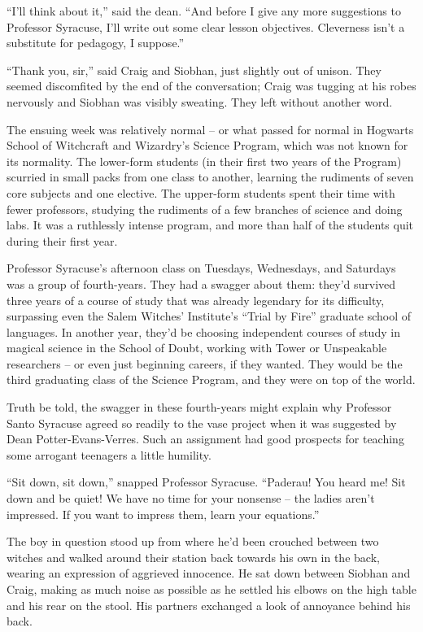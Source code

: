 ``I'll think about it,'' said the dean. ``And before I give any more
suggestions to Professor Syracuse, I'll write out some clear lesson
objectives. Cleverness isn't a substitute for pedagogy, I suppose.''

``Thank you, sir,'' said Craig and Siobhan, just slightly out of unison.
They seemed discomfited by the end of the conversation; Craig was
tugging at his robes nervously and Siobhan was visibly sweating. They
left without another word.

\mybreak

The ensuing week was relatively normal -- or what passed for normal in
Hogwarts School of Witchcraft and Wizardry's Science Program, which was
not known for its normality. The lower-form students (in their first two
years of the Program) scurried in small packs from one class to another,
learning the rudiments of seven core subjects and one elective. The
upper-form students spent their time with fewer professors, studying the
rudiments of a few branches of science and doing labs. It was a
ruthlessly intense program, and more than half of the students quit
during their first year.

Professor Syracuse's afternoon class on Tuesdays, Wednesdays, and
Saturdays was a group of fourth-years. They had a swagger about them:
they'd survived three years of a course of study that was already
legendary for its difficulty, surpassing even the Salem Witches'
Institute's ``Trial by Fire'' graduate school of languages. In another
year, they'd be choosing independent courses of study in magical science
in the School of Doubt, working with Tower or Unspeakable researchers --
or even just beginning careers, if they wanted. They would be the third
graduating class of the Science Program, and they were on top of the
world.

Truth be told, the swagger in these fourth-years might explain why
Professor Santo Syracuse agreed so readily to the vase project when it
was suggested by Dean Potter-Evans-Verres. Such an assignment had good
prospects for teaching some arrogant teenagers a little humility.

``Sit down, sit down,'' snapped Professor Syracuse. ``Paderau! You heard
me! Sit down and be quiet! We have no time for your nonsense -- the
ladies aren't impressed. If you want to impress them, learn your
equations.''

The boy in question stood up from where he'd been crouched between two
witches and walked around their station back towards his own in the
back, wearing an expression of aggrieved innocence. He sat down between
Siobhan and Craig, making as much noise as possible as he settled his
elbows on the high table and his rear on the stool. His partners
exchanged a look of annoyance behind his back.

